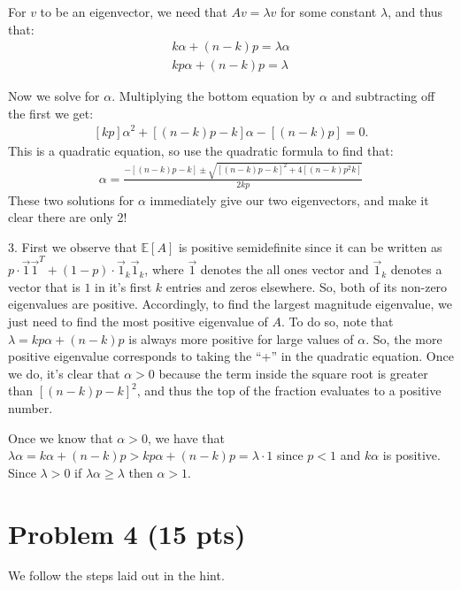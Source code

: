 \documentclass[11pt]{article}
\newcommand{\E}{\mathbb{E}}
\begin{document}
For $v$ to be an eigenvector, we need that $Av = \lambda v$ for some constant $\lambda$, and thus that:
\begin{align*}
	k\alpha + (n-k)p = \lambda \alpha\\
	kp\alpha + (n-k)p = \lambda 
	\end{align*}

Now we solve for $\alpha$. Multiplying the bottom equation by $\alpha$ and subtracting off the first we get:
\begin{align*}
	\left[kp\right]\alpha^2 + \left[(n-k)p - k\right] \alpha - \left[(n-k)p\right] = 0.
\end{align*}
This is a quadratic equation, so use the quadratic formula to find that:
\begin{align*}
	\alpha = \frac{- \left[(n-k)p - k\right] \pm \sqrt{\left[(n-k)p - k\right]^2 + 4\left[(n-k)p^2k\right]}}{2kp}
\end{align*}
These two solutions for $\alpha$ immediately give our two eigenvectors, and make it clear there are only 2!

3. First we observe that $\E[A]$ is positive semidefinite since it can be written as $p\cdot \vec{1}\vec{1}^T + (1-p)\cdot \vec{1}_k\vec{1}_k$, where $\vec{1}$ denotes the all ones vector and $\vec{1}_k$ denotes a vector that is $1$ in it's first $k$ entries and zeros elsewhere. So, both of its non-zero eigenvalues are positive. Accordingly, to find the largest magnitude eigenvalue, we just need to find the most positive eigenvalue of $A$. To do so, note that $\lambda = kp\alpha + (n-k)p$ is always more positive for large values of $\alpha$. So, the more positive eigenvalue corresponds to taking the ``+'' in the quadratic equation. Once we do, it's clear that $\alpha > 0$ because the term inside the square root is greater than $\left[(n-k)p - k\right]^2 $, and thus the top of the fraction evaluates to a positive number. 

Once we know that $\alpha > 0$,  we have that $\lambda \alpha = k\alpha + (n-k)p > kp\alpha + (n-k)p  = \lambda \cdot 1$ since $p < 1$ and $k \alpha$ is positive. Since $\lambda > 0$ if $\lambda \alpha \geq \lambda$ then $\alpha > 1$.



\section*{Problem 4 (\textbf{15 pts})}
We follow the steps laid out in the hint. 
\end{document}
